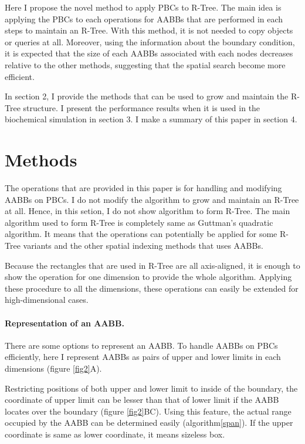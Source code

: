 \documentclass[10pt,letterpaper,twocolumn]{article}
\begin{document}
Here I propose the novel method to apply PBCs to R-Tree. The main idea is
applying the PBCs to each operations for AABBs that are performed in each steps to
maintain an R-Tree. With this method, it is not needed to copy objects or
queries at all. Moreover, using the information about the boundary condition,
it is expected that the size of each AABBs associated with each nodes decreases
relative to the other methods, suggesting that the spatial search become more
efficient.

In section 2, I provide the methods that can be used to grow and maintain the
R-Tree structure. I present the performance results when it is used in the
biochemical simulation in section 3. I make a summary of this paper in section 4.

\section*{Methods}

The operations that are provided in this paper is for handling and modifying
AABBs on PBCs. I do not modify the algorithm to grow and maintain an R-Tree at all.
Hence, in this setion, I do not show algorithm to form R-Tree. The main algorithm
used to form R-Tree is completely same as Guttman's quadratic algorithm.
It means that the operations can potentially be applied for some R-Tree variants
and the other spatial indexing methods that uses AABBs.

Because the rectangles that are used in R-Tree are all axis-aligned, it is
enough to show the operation for one dimension to provide the whole algorithm.
Applying these procedure to all the dimensions, these operations can easily be
extended for high-dimensional cases.

\paragraph{Representation of an AABB.}
There are some options to represent an AABB. To handle AABBs on PBCs efficiently,
here I represent AABBs as pairs of upper and lower limits in each dimensions
(figure \ref{fig2}A).

Restricting positions of both upper and lower limit to inside of the boundary,
the coordinate of upper limit can be lesser than that of lower limit if the AABB
locates over the boundary (figure \ref{fig2}BC). Using this feature, the actual
range occupied by the AABB can be determined easily (algorithm\ref{span}).
If the upper coordinate is same as lower coordinate, it means sizeless box.
\end{document}
